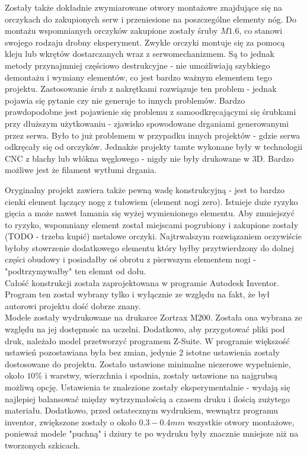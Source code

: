 Zostały także dokładnie zwymiarowane otwory montażowe znajdujące się na orczykach do zakupionych serw i przeniesione na poszczególne elementy nóg. Do montażu wspomnianych orczyków zakupione zostały śruby $M1.6$, co stanowi swojego rodzaju drobny eksperyment. Zwykle orczyki montuje się za pomocą kleju lub wkrętów dostarczanych wraz z serwomechanizmem. Są to jednak metody przynajmniej częściowo destrukcyjne - nie umożliwiają szybkiego demontażu i wymiany elementów, co jest bardzo ważnym elementem tego projektu. Zastosowanie śrub z nakrętkami rozwiązuje ten problem - jednak pojawia się pytanie czy nie generuje to innych problemów. Bardzo prawdopodobne jest pojawienie się problemu z samoodkręcającymi się śrubkami przy dłuższym użytkowaniu - zjawisko spowodowane drganiami generowanymi przez serwa. Było to już problemem w przypadku innych projektów - gdzie serwa odkręcały się od orczyków. Jednakże projekty tamte wykonane były w technologii CNC z blachy lub włókna węglowego - nigdy nie były drukowane w 3D. Bardzo możliwe jest że filament wytłumi drgania.

Oryginalny projekt zawiera także pewną wadę konstrukcyjną - jest to bardzo cienki element łączący nogę z tułowiem (element nogi zero). Istnieje duże ryzyko gięcia a może nawet łamania się wyżej wymienionego elementu. Aby zmniejszyć to ryzyko, wspomniany element został miejscami pogrubiony i zakupione zostały (TODO - trzeba kupić) metalowe orczyki. Najtrwalszym rozwiązaniem oczywiście byłoby stowrzenie dodatkowego elementu który byłby przytwierdzony do dolnej części obudowy i posiadałby oś obrotu z pierwszym elementem nogi -  "podtrzymywałby" ten elemnt od dołu.\\

Całość konstrukcji została zaprojektowana w programie Autodesk Inventor. Program ten został wybrany tylko i wyłącznie ze względu na fakt, że był autorowi projektu dość dobrze znany.\\

Modele zostały wydrukowane na drukarce Zortrax M200. Została ona wybrana ze względu na jej dostępnośc na uczelni. Dodatkowo, aby przygotować pliki pod druk, należało model przetworzyć programem Z-Suite. W programie większość ustawień pozostawiana była bez zmian, jedynie 2 istotne ustawienia zostały dostosowane do projektu. Zostało ustawione minimalne niezerowe wypełnienie, około $10\%$ i warstwy, wierzchnia i spodnia, zostały ustawione na najgrubsą możliwą opcję. Ustawienia te znalezione zostały eksperymentalnie - wydają się najlepiej balansować między wytrzymałością a czasem druku i ilością zużytego materiału. Dodatkowo, przed ostatecznym wydrukiem, wewnątrz programu inventor, zwiększone zostały o około $0.3-0.4 mm$ wszystkie otwory montażowe, ponieważ modele "puchną" i dziury te po wydruku były znacznie mniejsze niż na tworzonych szkicach.\\
